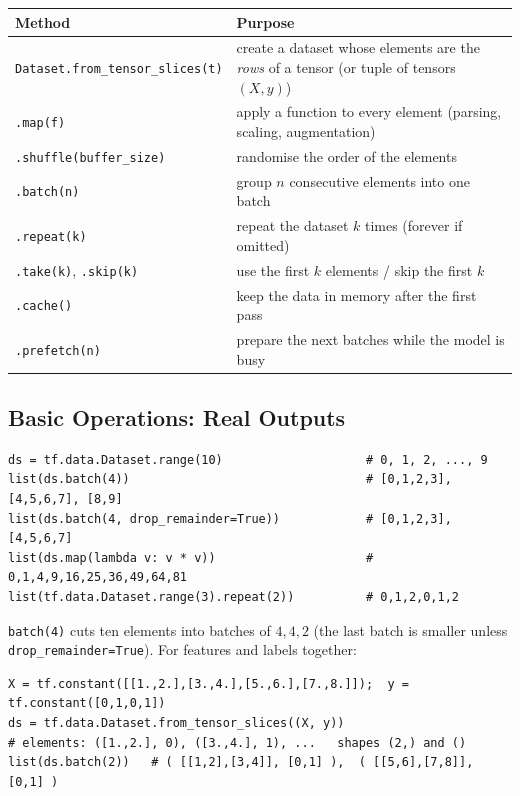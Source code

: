 \begin{center}
\begin{tabular}{@{}p{6.6cm}p{6.8cm}@{}}
\toprule
\textbf{Method} & \textbf{Purpose}\\
\midrule
\texttt{Dataset.from\_tensor\_slices(t)} & create a dataset whose elements are the \emph{rows} of a tensor (or tuple of tensors $(X,y)$)\\
\texttt{.map(f)} & apply a function to every element (parsing, scaling, augmentation)\\
\texttt{.shuffle(buffer\_size)} & randomise the order of the elements\\
\texttt{.batch(n)} & group $n$ consecutive elements into one batch\\
\texttt{.repeat(k)} & repeat the dataset $k$ times (forever if omitted)\\
\texttt{.take(k)}, \texttt{.skip(k)} & use the first $k$ elements / skip the first $k$\\
\texttt{.cache()} & keep the data in memory after the first pass\\
\texttt{.prefetch(n)} & prepare the next batches while the model is busy\\
\bottomrule
\end{tabular}
\end{center}

\subsection{Basic Operations: Real Outputs}

\begin{lstlisting}
ds = tf.data.Dataset.range(10)                    # 0, 1, 2, ..., 9
list(ds.batch(4))                                 # [0,1,2,3], [4,5,6,7], [8,9]
list(ds.batch(4, drop_remainder=True))            # [0,1,2,3], [4,5,6,7]
list(ds.map(lambda v: v * v))                     # 0,1,4,9,16,25,36,49,64,81
list(tf.data.Dataset.range(3).repeat(2))          # 0,1,2,0,1,2
\end{lstlisting}

\noindent \texttt{batch(4)} cuts ten elements into batches of $4,4,2$ (the last batch is smaller unless \texttt{drop\_remainder=True}). For features and labels together:

\begin{lstlisting}
X = tf.constant([[1.,2.],[3.,4.],[5.,6.],[7.,8.]]);  y = tf.constant([0,1,0,1])
ds = tf.data.Dataset.from_tensor_slices((X, y))
# elements: ([1.,2.], 0), ([3.,4.], 1), ...   shapes (2,) and ()
list(ds.batch(2))   # ( [[1,2],[3,4]], [0,1] ),  ( [[5,6],[7,8]], [0,1] )
\end{lstlisting}

